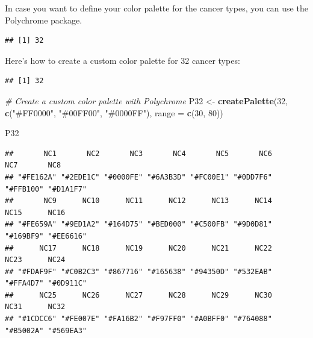 \documentclass[
]{book}
\newenvironment{Shaded}{\begin{snugshade}}{\end{snugshade}}
\newcommand{\AttributeTok}[1]{\textcolor[rgb]{0.13,0.29,0.53}{#1}}
\newcommand{\CommentTok}[1]{\textcolor[rgb]{0.56,0.35,0.01}{\textit{#1}}}
\newcommand{\DecValTok}[1]{\textcolor[rgb]{0.00,0.00,0.81}{#1}}
\newcommand{\FunctionTok}[1]{\textcolor[rgb]{0.13,0.29,0.53}{\textbf{#1}}}
\newcommand{\NormalTok}[1]{#1}
\newcommand{\OtherTok}[1]{\textcolor[rgb]{0.56,0.35,0.01}{#1}}
\newcommand{\SpecialCharTok}[1]{\textcolor[rgb]{0.81,0.36,0.00}{\textbf{#1}}}
\newcommand{\StringTok}[1]{\textcolor[rgb]{0.31,0.60,0.02}{#1}}
\begin{document}
In case you want to define your color palette for the cancer types, you can use the Polychrome package.

\begin{Shaded}
\end{Shaded}

\begin{verbatim}
## [1] 32
\end{verbatim}

Here's how to create a custom color palette for 32 cancer types:

\begin{Shaded}
\end{Shaded}

\begin{verbatim}
## [1] 32
\end{verbatim}

\begin{Shaded}
\begin{Highlighting}[]
\CommentTok{\# Create a custom color palette with Polychrome}
\NormalTok{P32 }\OtherTok{\textless{}{-}} \FunctionTok{createPalette}\NormalTok{(}\DecValTok{32}\NormalTok{, }\FunctionTok{c}\NormalTok{(}\StringTok{"\#FF0000"}\NormalTok{, }\StringTok{"\#00FF00"}\NormalTok{, }\StringTok{"\#0000FF"}\NormalTok{), }\AttributeTok{range =} \FunctionTok{c}\NormalTok{(}\DecValTok{30}\NormalTok{, }\DecValTok{80}\NormalTok{))}

\NormalTok{P32}
\end{Highlighting}
\end{Shaded}

\begin{verbatim}
##       NC1       NC2       NC3       NC4       NC5       NC6       NC7       NC8 
## "#FE162A" "#2EDE1C" "#0000FE" "#6A3B3D" "#FC00E1" "#0DD7F6" "#FFB100" "#D1A1F7" 
##       NC9      NC10      NC11      NC12      NC13      NC14      NC15      NC16 
## "#FE659A" "#9ED1A2" "#164D75" "#BED000" "#C500FB" "#9D0D81" "#169BF9" "#EE6616" 
##      NC17      NC18      NC19      NC20      NC21      NC22      NC23      NC24 
## "#FDAF9F" "#C0B2C3" "#867716" "#165638" "#94350D" "#532EAB" "#FFA4D7" "#0D911C" 
##      NC25      NC26      NC27      NC28      NC29      NC30      NC31      NC32 
## "#1CDCC6" "#FE007E" "#FA16B2" "#F97FF0" "#A0BFF0" "#764088" "#B5002A" "#569EA3"
\end{verbatim}
\end{document}
